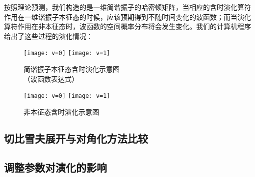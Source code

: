 按照理论预测，我们构造的是一维简谐振子的哈密顿矩阵，当相应的含时演化算符作用在一维谐振子本征态的时候，应该预期得到不随时间变化的波函数；而当演化算符作用在非本征态时，波函数的空间概率分布将会发生变化。我们的计算机程序给出了这些过程的演化情况：
\begin{figure}[hbt]
  \center
  \vspace{1mm}
  \texttt{[image: v=0]}
  \texttt{[image: v=1]}
  \caption{简谐振子本征态含时演化示意图\\
            （波函数表达式） \label{fig:prop1}}
\end{figure}

\begin{figure}[hbt]
  \center
  \vspace{1mm}
  \texttt{[image: v=0]}
  \texttt{[image: v=1]}
  \caption{非本征态含时演化示意图 \label{fig:prop2}}
\end{figure}

\subsection{切比雪夫展开与对角化方法比较}
\subsection{调整参数对演化的影响}